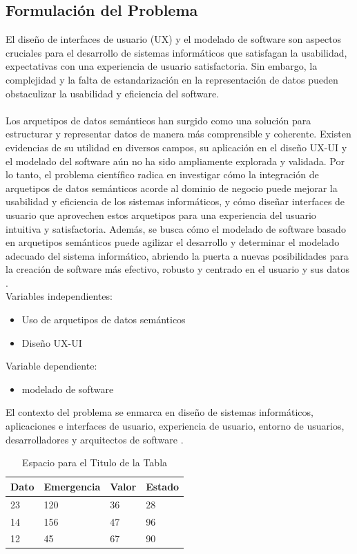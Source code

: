 \documentclass[12pt,a4paper]{article}
\begin{document}
\subsection{Formulación del Problema}
\label{sec:2}
El diseño de interfaces de usuario (UX) y el modelado de software son aspectos cruciales para el desarrollo de sistemas informáticos que satisfagan la usabilidad, expectativas con una experiencia de usuario satisfactoria. Sin embargo, la complejidad y la falta de estandarización en la representación de datos pueden obstaculizar la usabilidad y eficiencia del software. 
\\\\
Los arquetipos de datos semánticos han surgido como una solución para estructurar y representar datos de manera más comprensible y coherente. Existen evidencias de su utilidad en diversos campos, su aplicación en el diseño UX-UI y el modelado del software aún no ha sido ampliamente explorada y validada. Por lo tanto, el problema científico radica en investigar cómo la integración de arquetipos de datos semánticos acorde al dominio de negocio puede mejorar la usabilidad y eficiencia de los sistemas informáticos, y cómo diseñar interfaces de usuario que aprovechen estos arquetipos para una experiencia del usuario intuitiva y satisfactoria. Además, se busca cómo el modelado de software basado en arquetipos semánticos puede agilizar el desarrollo y determinar el modelado adecuado del sistema informático, abriendo la puerta a nuevas posibilidades para la creación de software más efectivo, robusto y centrado en el usuario y sus datos \cite{Inga2023}.
\\
Variables independientes: 
\begin{itemize}
  \item Uso de arquetipos de datos semánticos
  \item Diseño UX-UI
\end{itemize}
Variable dependiente:
 \begin{itemize}
  \item modelado de software
\end{itemize}
El contexto del problema se enmarca en diseño de sistemas informáticos, aplicaciones e interfaces de usuario, experiencia de usuario, entorno de usuarios, desarrolladores y arquitectos de software \cite{Inga2023}.
\\
\begin{table}[H]
\centering
\caption{Espacio para el Titulo de la Tabla}
\label{tabB}
\begin{tabular}{llll}
Dato & Emergencia & Valor & Estado \\
\hline
23   & 120        & 36    & 28     \\
\hline
14   & 156        & 47    & 96     \\
\hline
12   & 45         & 67    & 90   \\
\hline
\end{tabular}
\end{table}
\end{document}
